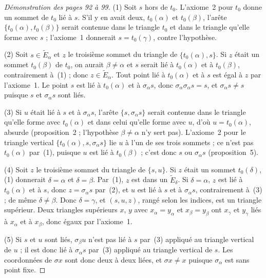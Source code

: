 \begin{proof}[Démonstration des pages 92 à 99]
(1) Soit $s$ hors de $t_0$. L'axiome~2 pour $t_0$ donne un sommet de $t_0$ lié à $s$. S'il y en avait deux, $t_0(\alpha)$ et $t_0(\beta)$, l'arête $\{t_0(\alpha), t_0(\beta)\}$ serait contenue dans le triangle $t_0$ et dans le triangle qu'elle forme avec $s$ ; l'axiome~1 donnerait $s = t_0(\gamma)$, contre l'hypothèse.

(2) Soit $s \in \widetilde E_\alpha$ et $z$ le troisième sommet du triangle de $\{t_0(\alpha), s\}$. Si $z$ était un sommet $t_0(\beta)$ de $t_0$, on aurait $\beta \neq \alpha$ et $s$ serait lié à $t_0(\alpha)$ et à $t_0(\beta)$, contrairement à~(1) ; donc $z \in \widetilde E_\alpha$. Tout point lié à $t_0(\alpha)$ et à $s$ est égal à $z$ par l'axiome~1. Le point $s$ est lié à $t_0(\alpha)$ et à $\sigma_\alpha s$, donc $\sigma_\alpha \sigma_\alpha s = s$, et $\sigma_\alpha s \neq s$ puisque $s$ et $\sigma_\alpha s$ sont liés.

(3) Si $u$ était lié à $s$ et à $\sigma_\alpha s$, l'arête $\{s, \sigma_\alpha s\}$ serait contenue dans le triangle qu'elle forme avec $t_0(\alpha)$ et dans celui qu'elle forme avec $u$, d'où $u = t_0(\alpha)$, absurde (proposition~2 ; l'hypothèse $\beta \neq \alpha$ n'y sert pas). L'axiome~2 pour le triangle vertical $\{t_0(\alpha), s, \sigma_\alpha s\}$ lie $u$ à l'un de ses trois sommets ; ce n'est pas $t_0(\alpha)$ par~(1), puisque $u$ est lié à $t_0(\beta)$ ; c'est donc $s$ ou $\sigma_\alpha s$ (proposition~5).

(4) Soit $z$ le troisième sommet du triangle de $\{s, u\}$. Si $z$ était un sommet $t_0(\delta)$, (1) donnerait $\delta = \alpha$ et $\delta = \beta$. Par~(1), $z$ est dans un $\widetilde E_\delta$. Si $\delta = \alpha$, $z$ est lié à $t_0(\alpha)$ et à $s$, donc $z = \sigma_\alpha s$ par~(2), et $u$ est lié à $s$ et à $\sigma_\alpha s$, contrairement à~(3) ; de même $\delta \neq \beta$. Donc $\delta = \gamma$, et $(s, u, z)$, rangé selon les indices, est un triangle supérieur. Deux triangles supérieurs $x$, $y$ avec $x_\alpha = y_\alpha$ et $x_\beta = y_\beta$ ont $x_\gamma$ et $y_\gamma$ liés à $x_\alpha$ et à $x_\beta$, donc égaux par l'axiome~1.

(5) Si $s$ et $u$ sont liés, $\sigma_\beta u$ n'est pas lié à $s$ par~(3) appliqué au triangle vertical de $u$ ; il est donc lié à $\sigma_\alpha s$ par~(3) appliqué au triangle vertical de $s$. Les coordonnées de $\sigma x$ sont donc deux à deux liées, et $\sigma x \neq x$ puisque $\sigma_\alpha$ est sans point fixe.
\end{proof}


